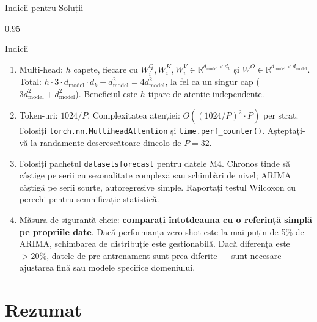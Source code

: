 \documentclass[9pt, aspectratio=169, t]{beamer}
\begin{document}
\begin{frame}{Indicii pentru Soluții}
    \begin{cminipage}{0.95\textwidth}
    \vspace{-0.3cm}
    {\footnotesize
    \begin{block}{Indicii}
        \begin{enumerate}\setlength{\itemsep}{1pt}
            \item Multi-head: $h$ capete, fiecare cu $W^Q_i, W^K_i, W^V_i \in \mathbb{R}^{d_{\text{model}} \times d_k}$ și $W^O \in \mathbb{R}^{d_{\text{model}} \times d_{\text{model}}}$. Total: $h \cdot 3 \cdot d_{\text{model}} \cdot d_k + d_{\text{model}}^2 = 4d_{\text{model}}^2$, la fel ca un singur cap ($3d_{\text{model}}^2 + d_{\text{model}}^2$). Beneficiul este $h$ tipare de atenție independente.

            \item Token-uri: $1024/P$. Complexitatea atenției: $O((1024/P)^2 \cdot P)$ per strat. Folosiți \texttt{torch.nn.MultiheadAttention} și \texttt{time.perf\_counter()}. Așteptați-vă la randamente descrescătoare dincolo de $P = 32$.

            \item Folosiți pachetul \texttt{datasetsforecast} pentru datele M4. Chronos tinde să câștige pe serii cu sezonalitate complexă sau schimbări de nivel; ARIMA câștigă pe serii scurte, autoregresive simple. Raportați testul Wilcoxon cu perechi pentru semnificație statistică.

            \item Măsura de siguranță cheie: \textbf{comparați întotdeauna cu o referință simplă pe propriile date}. Dacă performanța zero-shot este la mai puțin de 5\% de ARIMA, schimbarea de distribuție este gestionabilă. Dacă diferența este $> 20\%$, datele de pre-antrenament sunt prea diferite --- sunt necesare ajustarea fină sau modele specifice domeniului.
        \end{enumerate}
    \end{block}
    }
    \end{cminipage}
\end{frame}

\section{Rezumat}
\end{document}
